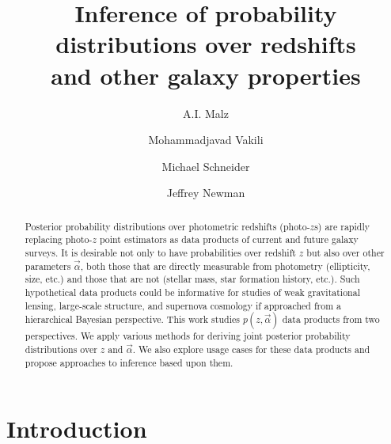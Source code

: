 \documentclass[12pt, preprint]{aastex}
\begin{document}
\title{Inference of probability distributions over redshifts\\ and other galaxy properties}

\author{A.I. Malz}
\author{Mohammadjavad Vakili}
\author{Michael Schneider}
\author{Jeffrey Newman}



\begin{abstract}
Posterior probability distributions over photometric redshifts (photo-$z$s) are rapidly replacing photo-$z$ point estimators as data products of current and future galaxy surveys.  It is desirable not only to have probabilities over redshift $z$ but also over other parameters $\vec{\alpha}$, both those that are directly measurable from photometry (ellipticity, size, etc.) and those that are not (stellar mass, star formation history, etc.).  Such hypothetical data products could be informative for studies of weak gravitational lensing, large-scale structure, and supernova cosmology if approached from a hierarchical Bayesian perspective.  This work studies $p(z,\vec{\alpha})$ data products from two perspectives.  We apply various methods for deriving joint posterior probability distributions over $z$ and $\vec{\alpha}$.  We also explore usage cases for these data products and propose approaches to inference based upon them.
\end{abstract}

\section{Introduction}
\end{document}
